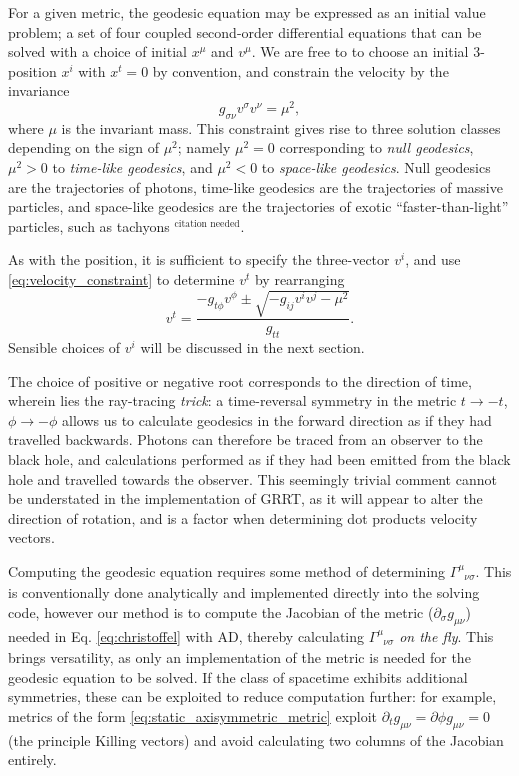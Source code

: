 \documentclass[fleqn,usenatbib]{mnras}
\newcommand{\citneeded}{{\bf \color{red} $^{\text{citation needed}}$}}
\newcommand{\utensor}[3]{#1^{#2}_{\phantom{#2}#3}}
\newcommand{\vel}[1]{v^{#1}}
\begin{document}
For a given metric, the geodesic equation may be expressed as an initial value
problem; a set of four coupled second-order differential equations that can be
solved with a choice of initial $x^\mu$ and $\vel{\mu}$. We are free to to
choose an initial 3-position $x^i$ with $x^t = 0$ by convention, and constrain
the velocity by the invariance
\begin{equation}
\label{eq:velocity_constraint}
    g_{\sigma\nu} \vel{\sigma} \vel{\nu} = \mu^2,
\end{equation}
where $\mu$ is the invariant mass. This constraint gives rise to three solution
classes depending on the sign of $\mu^2$; namely $\mu^2 = 0$ corresponding to
\emph{null geodesics}, $\mu^2 > 0$ to \emph{time-like geodesics}, and $\mu^2 <
0$ to \emph{space-like geodesics}. Null geodesics are the trajectories of
photons, time-like geodesics are the trajectories of massive particles, and
space-like geodesics are the trajectories of exotic ``faster-than-light''
particles, such as tachyons
\citneeded.

As with the position, it is sufficient to specify the three-vector $\vel{i}$,
and use \ref{eq:velocity_constraint} to determine $\vel{t}$ by rearranging
\begin{equation}
\vel{t}  = \frac{-g_{t\phi} \vel{\phi} \pm
    \sqrt{-g_{ij} \vel{i} \vel{j} - \mu^2}
}{g_{tt}}.
\end{equation}
Sensible choices of $v^i$ will be discussed in the next section.

The choice of positive or negative root corresponds to the direction of time,
wherein lies the ray-tracing \textit{trick}: a time-reversal symmetry in the
metric $t \rightarrow -t$, $\phi \rightarrow -\phi$ allows us to calculate
geodesics in the forward direction as if they had travelled backwards. Photons
can therefore be traced from an observer to the black hole, and calculations
performed as if they had been emitted from the black hole and travelled towards
the observer. This seemingly trivial comment cannot be understated in the
implementation of GRRT, as it will appear to alter the direction of rotation,
and is a factor when determining dot products velocity vectors.

Computing the geodesic equation requires some method of determining
$\utensor{\Gamma}{\mu}{\nu\sigma}$. This is conventionally done analytically
and implemented directly into the solving code, however our method is to
compute the Jacobian of the metric ($\partial_{\sigma} g_{\mu \nu}$) needed in
Eq. \eqref{eq:christoffel} with AD, thereby calculating
$\utensor{\Gamma}{\mu}{\nu\sigma}$ \textit{on the fly}.  This brings
versatility, as only an implementation of the metric is needed for the geodesic
equation to be solved.  If the class of spacetime exhibits additional
symmetries, these can be exploited to reduce computation further: for example,
metrics of the form \eqref{eq:static_axisymmetric_metric} exploit $\partial_t
g_{\mu\nu} = \partial{\phi} g_{\mu\nu} = 0$ (the principle Killing vectors) and
avoid calculating two columns of the Jacobian entirely.
\end{document}
